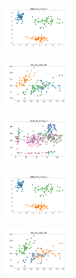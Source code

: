 \begin{figure}[H]
\begin{subfigure}
    \end{subfigure}
    \hfill
    \begin{subfigure}
        \centering
        \includegraphics[width=0.32\textwidth]{img/copkm/rand_set_const_20_277451237_clust.png}
    \end{subfigure}
    \hfill
    \begin{subfigure}
        \centering
        \includegraphics[width=0.32\textwidth]{img/copkm/iris_set_const_20_49258669_clust.png}
    \end{subfigure}
    \hfill
    \begin{subfigure}
        \centering
        \includegraphics[width=0.32\textwidth]{img/copkm/ecoli_set_const_20_49258669_clust.png}
    \end{subfigure}
    \hfill
    \begin{subfigure}
        \centering
        \includegraphics[width=0.32\textwidth]{img/copkm/rand_set_const_20_49258669_clust.png}
    \end{subfigure}
    \hfill
    \begin{subfigure}
        \centering
        \includegraphics[width=0.32\textwidth]{img/copkm/iris_set_const_20_3773969821_clust.png}

\end{subfigure}
\end{figure}
